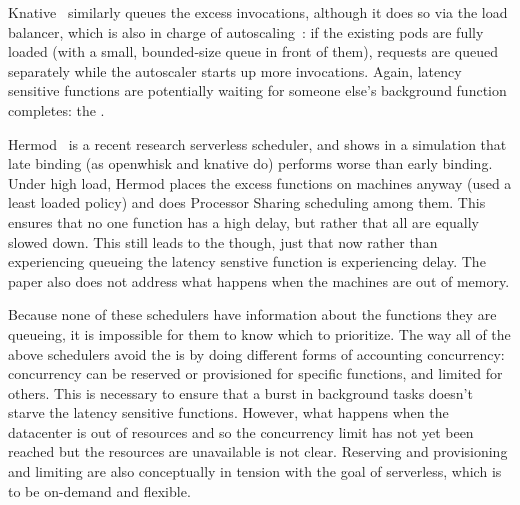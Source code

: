 Knative~\cite{knative} similarly queues the excess invocations, although it does
so via the load balancer, which is also in charge of
autoscaling~\cite{knative-sched}: if the existing pods are fully loaded (with a
small, bounded-size queue in front of them), requests are queued separately
while the autoscaler starts up more invocations. Again, latency sensitive
functions are potentially waiting for someone else's background function
completes: the \problem{}. 

Hermod~\cite{hermod} is a recent research serverless scheduler, and shows in a
simulation that late binding (as openwhisk and knative do) performs worse than
early binding. Under high load, Hermod places the excess functions on machines
anyway (used a least loaded policy) and does Processor Sharing scheduling among
them. This ensures that no one function has a high delay, but rather that all
are equally slowed down. This still leads to the \problem{} though, just that
now rather than experiencing queueing the latency senstive function is
experiencing delay. The paper also does not address what happens when the
machines are out of memory. 

Because none of these schedulers have information about the functions they are
queueing, it is impossible for them to know which to prioritize. The way all of
the above schedulers avoid the \problem{} is by doing different forms of
accounting concurrency: concurrency can be reserved or provisioned for specific
functions, and limited for others. This is necessary to ensure that a burst in
background tasks doesn't starve the latency sensitive functions. However, what
happens when the datacenter is out of resources and so the concurrency limit has
not yet been reached but the resources are unavailable is not clear. Reserving
and provisioning and limiting are also conceptually in tension with the goal of
serverless, which is to be on-demand and flexible.





